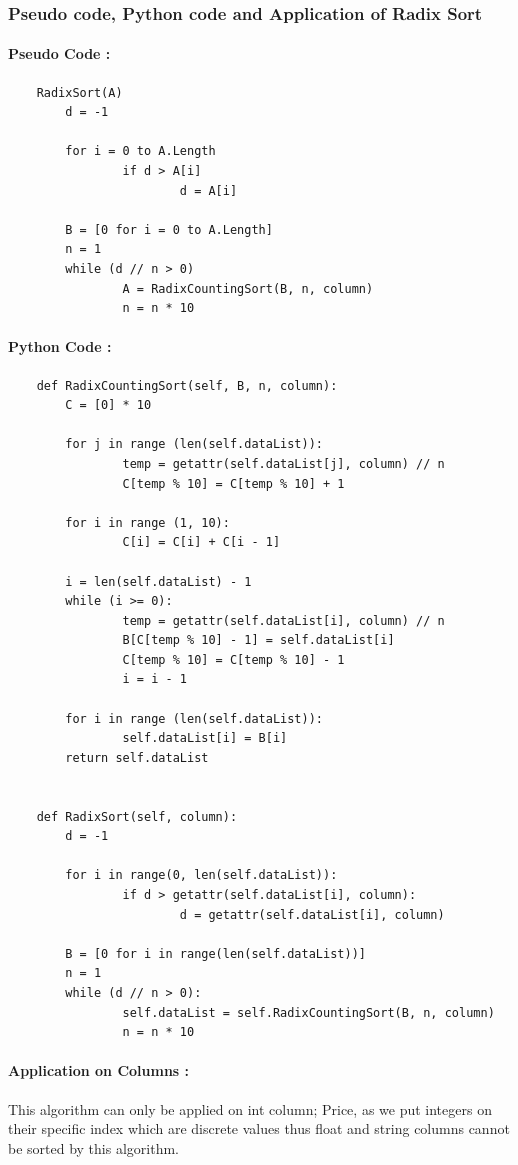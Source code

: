 \documentclass[12pt]{article}
\begin{document}
    \subsubsection{Pseudo code, Python code and Application of Radix Sort}
    \paragraph{Pseudo Code :}
    \begin{verbatim}
    RadixSort(A)
        d = -1

        for i = 0 to A.Length
                if d > A[i]
                        d = A[i]

        B = [0 for i = 0 to A.Length]
        n = 1
        while (d // n > 0)
                A = RadixCountingSort(B, n, column) 
                n = n * 10
    \end{verbatim}
    \paragraph{Python Code :}
    \begin{verbatim}
    def RadixCountingSort(self, B, n, column):
        C = [0] * 10

        for j in range (len(self.dataList)):
                temp = getattr(self.dataList[j], column) // n
                C[temp % 10] = C[temp % 10] + 1

        for i in range (1, 10):
                C[i] = C[i] + C[i - 1]

        i = len(self.dataList) - 1
        while (i >= 0):
                temp = getattr(self.dataList[i], column) // n 
                B[C[temp % 10] - 1] = self.dataList[i]
                C[temp % 10] = C[temp % 10] - 1
                i = i - 1

        for i in range (len(self.dataList)):
                self.dataList[i] = B[i]
        return self.dataList


    def RadixSort(self, column):
        d = -1

        for i in range(0, len(self.dataList)):
                if d > getattr(self.dataList[i], column):
                        d = getattr(self.dataList[i], column)

        B = [0 for i in range(len(self.dataList))]
        n = 1
        while (d // n > 0):
                self.dataList = self.RadixCountingSort(B, n, column)
                n = n * 10
    \end{verbatim}
    \paragraph{Application on Columns :} 
    This algorithm can only be applied on int column; Price, as we put integers on their specific index which are discrete values thus float and string columns cannot be sorted by this algorithm.
    
\end{document}
